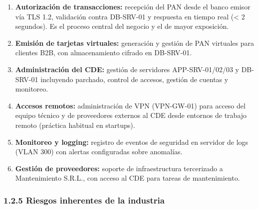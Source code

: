 \documentclass[11pt,a4paper]{article}
\begin{document}
\begin{enumerate}[leftmargin=*]
  \item \textbf{Autorización de transacciones:} recepción del PAN desde el banco emisor vía TLS 1.2, validación contra DB-SRV-01 y respuesta en tiempo real (< 2 segundos). Es el proceso central del negocio y el de mayor exposición.
  \item \textbf{Emisión de tarjetas virtuales:} generación y gestión de PAN virtuales para clientes B2B, con almacenamiento cifrado en DB-SRV-01.
  \item \textbf{Administración del CDE:} gestión de servidores APP-SRV-01/02/03 y DB-SRV-01 incluyendo parchado, control de accesos, gestión de cuentas y monitoreo.
  \item \textbf{Accesos remotos:} administración de VPN (VPN-GW-01) para acceso del equipo técnico y de proveedores externos al CDE desde entornos de trabajo remoto (práctica habitual en startups).
  \item \textbf{Monitoreo y logging:} registro de eventos de seguridad en servidor de logs (VLAN 300) con alertas configuradas sobre anomalías.
  \item \textbf{Gestión de proveedores:} soporte de infraestructura tercerizado a Mantenimiento S.R.L., con acceso al CDE para tareas de mantenimiento.
\end{enumerate}

\subsubsection{1.2.5 Riesgos inherentes de la industria}
\end{document}
